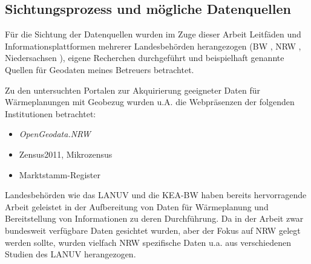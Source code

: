 			
			
			

		\subsection{Sichtungsprozess und mögliche Datenquellen}
			\label{sec:Daten:Aquise:Sichtung}
			Für die Sichtung der Datenquellen wurden im Zuge dieser Arbeit Leitfäden und Informationsplattformen mehrerer Landesbehörden herangezogen (BW \cite{kea_bw_leitfaden_waermeplanung}, NRW \cite{web_energieatlas}, Niedersachsen \cite{web_leitfaden_waermeplanung_datenquellen_niedersachsen}), eigene Recherchen durchgeführt und beispielhaft genannte Quellen für Geodaten meines Betreuers betrachtet. 
			
			Zu den untersuchten Portalen zur Akquirierung geeigneter Daten für Wärmeplanungen mit Geobezug wurden u.A. die Webpräsenzen der folgenden Institutionen betrachtet:
			
			\begin{itemize}
				\item \textit{OpenGeodata.NRW} \cite{web_download_opengeodata_nrw}
				\item Zensus2011, Mikrozensus \cite{web_zensusatlas}
				\item Marktstamm-Register \cite{web_mastr}
			\end{itemize}
	
			Landesbehörden wie das LANUV und die KEA-BW haben bereits hervorragende Arbeit geleistet in der Aufbereitung von Daten für Wärmeplanung und Bereitstellung von Informationen zu deren Durchführung. Da in der Arbeit zwar bundesweit verfügbare Daten gesichtet wurden, aber der Fokus auf NRW gelegt werden sollte, wurden vielfach NRW spezifische Daten u.a. aus verschiedenen Studien des LANUV herangezogen.  
	

